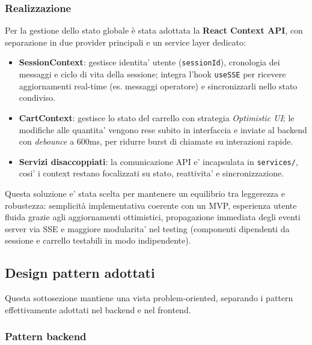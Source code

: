 \documentclass[a4paper, 11pt, oneside]{scrartcl}
\begin{document}
\subsubsection{Realizzazione}
Per la gestione dello stato globale è stata adottata la \textbf{React Context API}, con separazione in due provider principali e un service layer dedicato:
\begin{itemize}
    \item \textbf{SessionContext}: gestisce identita' utente (\texttt{sessionId}), cronologia dei messaggi e ciclo di vita della sessione; integra l'hook \texttt{useSSE} per ricevere aggiornamenti real-time (es. messaggi operatore) e sincronizzarli nello stato condiviso.
    \item \textbf{CartContext}: gestisce lo stato del carrello con strategia \textit{Optimistic UI}; le modifiche alle quantita' vengono rese subito in interfaccia e inviate al backend con \textit{debounce} a 600ms, per ridurre burst di chiamate su interazioni rapide.
    \item \textbf{Servizi disaccoppiati}: la comunicazione API e' incapsulata in \texttt{services/}, cosi' i context restano focalizzati su stato, reattivita' e sincronizzazione.
\end{itemize}

Questa soluzione e' stata scelta per mantenere un equilibrio tra leggerezza e robustezza: semplicit\`a implementativa coerente con un MVP, esperienza utente fluida grazie agli aggiornamenti ottimistici, propagazione immediata degli eventi server via SSE e maggiore modularita' nel testing (componenti dipendenti da sessione e carrello testabili in modo indipendente).

\subsection{Design pattern adottati}

Questa sottosezione mantiene una vista problem-oriented, separando i pattern effettivamente adottati nel backend e nel frontend.

\subsubsection{Pattern backend}
\end{document}
